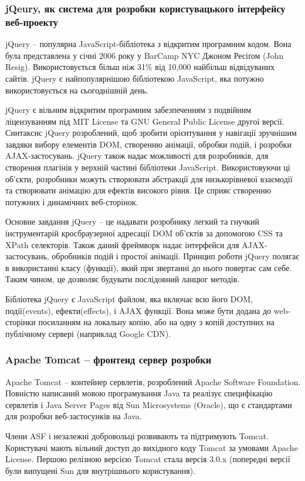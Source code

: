 \subsubsection{jQeury, як система для розробки користувацького інтерфейсу веб-проекту}
\par jQuery -- популярна JavaScript-бібліотека з відкритим програмним кодом. Вона була представлена у січні 2006 року у BarCamp NYC Джоном Ресіґом (John Resig). Використовується більш ніж 31\% від 10,000 найбільш відвідуваних сайтів. jQuery є найпопулярнішою бібліотекою JavaScript, яка потужно використовується на сьогоднішній день\cite{jquery_usage}.
\par jQuery є вільним відкритим програмним забезпеченням з подвійним ліцензуванням під MIT License та GNU General Public License другої версії. Синтаксис jQuery розроблений, щоб зробити орієнтування у навігації зручнішим завдяки вибору елементів DOM, створенню анімації, обробки подій, і розробки AJAX-застосувань. jQuery також надає можливості для розробників, для створення плагінів у верхній частині бібліотеки JavaScript. Використовуючи ці об'єкти, розробники можуть створювати абстракції для низькорівневої взаємодії та створювати анімацію для ефектів високого рівня. Це сприяє створенню потужних і динамічних веб-сторінок.
\par Основне завдання jQuery -- це надавати розробнику легкий та гнучкий інструментарій кросбраузерної адресації DOM об'єктів за допомогою CSS та XPath селекторів. Також даний фреймворк надає інтерфейси для AJAX-застосувань, обробників подій і простої анімації.
Принцип роботи jQuery полягає в використанні класу (функції), який при звертанні до нього повертає сам себе. Таким чином, це дозволяє будувати послідовний ланцюг методів.
\par Бібліотека jQuery є JavaScript файлом, яка включає всю його DOM, події(events), ефекти(effects), і AJAX функції. Вона може бути додана до web-сторінки посиланням на локальну копію, або на одну з копій доступних на публічному сервері (наприклад Google CDN).


\subsubsection{Apache Tomcat -- фронтенд сервер розробки}
\par Apache Tomcat -- контейнер сервлетів, розроблений Apache Software Foundation. Повністю написаний мовою програмування Java та реалізує специфікацію сервлетів і Java Server Pages від Sun Microsystems (Oracle), що є стандартами для розробки веб-застосунків на Java.
\par Члени ASF і незалежні добровольці розвивають та підтримують Tomcat. Користувачі мають вільний доступ до вихідного коду Tomcat за умовами Apache License. Першою релізною версією Tomcat стала версія 3.0.x (попередні версії були випущені Sun для внутрішнього користування).



